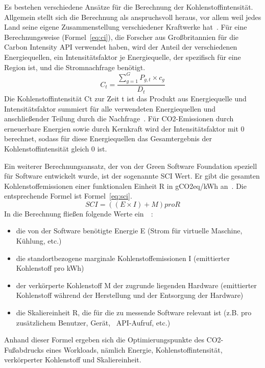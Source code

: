 Es bestehen verschiedene Ansätze für die Berechnung der Kohlenstoffintensität.
Allgemein stellt sich die Berechnung als anspruchsvoll heraus, vor allem weil jedes Land seine eigene Zusammenstellung verschiedener Kraftwerke hat~\cite{Currie.2024}.
Für eine Berechnungsweise (Formel~\ref{eq:ci}), die Forscher aus Großbritannien für die Carbon Intensity \ac{API} verwendet haben, wird der Anteil der verschiedenen Energiequellen, ein Intensitätsfaktor je Energiequelle, der spezifisch für eine Region ist, und die Stromnachfrage benötigt.
\begin{equation}
 \label{eq:ci}
 C_t = \frac{\sum_{g=1}^{G} P_{g,t} \times c_g}{D_t}
\end{equation}
Die Kohlenstoffintensität Ct zur Zeit t ist das Produkt aus Energiequelle und Intensitätsfaktor summiert für alle verwendeten Energiequellen und anschließender Teilung durch die Nachfrage~\cite{LyndonRuff.20220420T15:34:17.000Z}.
Für \ac{CO2}-Emissionen durch erneuerbare Energien sowie durch Kernkraft wird der Intensitätsfaktor mit 0 berechnet, sodass für diese Energiequellen das Gesamtergebnis der Kohlenstoffintensität gleich 0 ist.

Ein weiterer Berechnungsansatz, der von der Green Software Foundation speziell für Software entwickelt wurde, ist der sogenannte \ac{SCI} Wert.
Er gibt die gesamten Kohlenstoffemissionen einer funktionalen Einheit R in g\ac{CO2}eq/\ac{kWh} an~\cite{GreenSoftwareFoundation.2022}.
Die entsprechende Formel ist Formel~\ref{eq:sci}.
\begin{equation}
 \label{eq:sci}
 SCI = ((E \times I) + M) pro R
\end{equation}
In die Berechnung fließen folgende Werte ein~\cite{Buchanan.2023}~\cite{GreenSoftwareFoundation.2022}:
\begin{itemize}
 \item die von der Software benötigte Energie E (Strom für virtuelle Maschine, Kühlung, etc.)
 \item die standortbezogene marginale Kohlenstoffemissionen I (emittierter Kohlenstoff pro \ac{kWh})
 \item der verkörperte Kohlenstoff M der zugrunde liegenden Hardware (emittierter Kohlenstoff während der Herstellung und der Entsorgung der Hardware)
 \item die Skaliereinheit R, die für die zu messende Software relevant ist (z.B. pro zusätzlichem Benutzer, Gerät, ~\ac{API}-Aufruf, etc.)
\end{itemize}
Anhand dieser Formel ergeben sich die Optimierungspunkte des \ac{CO2}-Fußabdrucks eines Workloads, nämlich Energie, Kohlenstoffintensität, verkörperter Kohlenstoff und Skaliereinheit.
